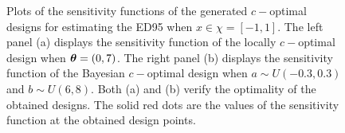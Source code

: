   
  
\begin{figure}[t!]
\centering
{}
\caption{
  Plots of the sensitivity functions of the generated $c-$optimal designs for estimating the ED95 when  $x \in \chi =  [-1, 1]$. The left panel (a) displays the sensitivity function of the locally  $c-$optimal design when $\boldsymbol{\theta} = (0, 7)$. The right panel (b) displays the sensitivity function of the  Bayesian $c-$optimal design  when $a\sim U(-0.3, 0.3)$ and $b \sim U(6, 8)$. Both (a) and (b) verify the optimality of the obtained designs. The solid red dots are the values of the sensitivity function at the obtained design points.
}
\label{fig:c-optimal-2pl}
\end{figure}

